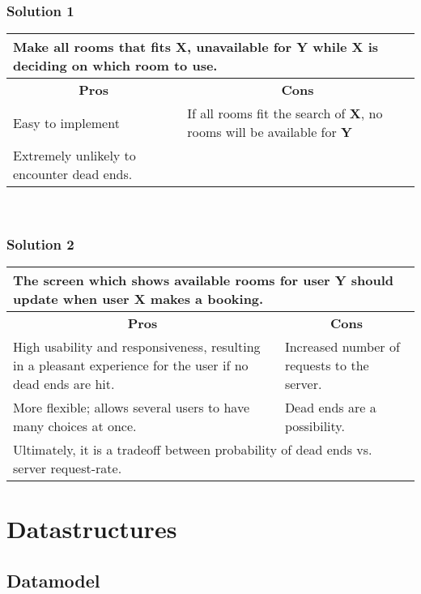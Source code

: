 \subsubsection*{Solution 1}
\begin{tabular}{|p{6cm}|p{6cm}|}
\hline 
	\multicolumn{2}{|p{12cm}|}{Make all rooms that fits \textbf{X}, unavailable for \textbf{Y} while \textbf{X} is deciding on which room to use.} \\ \hline \hline
	\multicolumn{1}{|c|}{\textbf{Pros}} & \multicolumn{1}{c|}{\textbf{Cons}} \\ \hline
	Easy to implement & If all rooms fit the search of \textbf{X}, no rooms will be available for \textbf{Y} \\ \hline
	Extremely unlikely to encounter dead ends. & \\
	\hline
\end{tabular}
\\
\subsubsection*{Solution 2}
\begin{tabular}{|p{6cm}|p{6cm}|}
\hline
	\multicolumn{2}{|p{12cm}|}{The screen which shows available rooms for user \textbf{Y} should update when user \textbf{X} makes a booking.} \\ \hline \hline
	\multicolumn{1}{|c|}{\textbf{Pros}} & \multicolumn{1}{c|}{\textbf{Cons}} \\ \hline
	High usability and responsiveness, resulting in a pleasant experience for the user if no dead ends are hit. & Increased number of requests to the server. \\ \hline
	More flexible; allows several users to have many choices at once. & Dead ends are a possibility. \\
	\hline
	\multicolumn{2}{|p{12cm}|}{Ultimately, it is a tradeoff between probability of dead ends vs. server request-rate.} \\
	\hline
\end{tabular}

\section{Datastructures}

\subsection{Datamodel}


